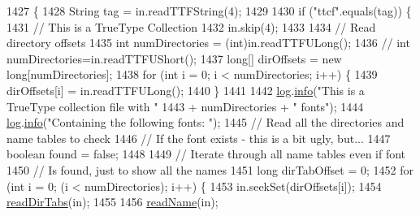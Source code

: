 \begin{DoxyCode}
1427                                                                                         \{
1428         String tag = in.readTTFString(4);
1429 
1430         \textcolor{keywordflow}{if} (\textcolor{stringliteral}{"ttcf"}.equals(tag)) \{
1431             \textcolor{comment}{// This is a TrueType Collection}
1432             in.skip(4);
1433 
1434             \textcolor{comment}{// Read directory offsets}
1435             \textcolor{keywordtype}{int} numDirectories = (int)in.readTTFULong();
1436             \textcolor{comment}{// int numDirectories=in.readTTFUShort();}
1437             \textcolor{keywordtype}{long}[] dirOffsets = \textcolor{keyword}{new} \textcolor{keywordtype}{long}[numDirectories];
1438             \textcolor{keywordflow}{for} (\textcolor{keywordtype}{int} i = 0; i < numDirectories; i++) \{
1439                 dirOffsets[i] = in.readTTFULong();
1440             \}
1441 
1442             \mbox{\hyperlink{classorg_1_1newdawn_1_1slick_1_1tools_1_1hiero_1_1truetype_1_1_t_t_f_file_ae6acbd4aea68fd8cf15305aa535993f4}{log}}.\mbox{\hyperlink{classorg_1_1newdawn_1_1slick_1_1tools_1_1hiero_1_1truetype_1_1_log_a7c258286d01348186fadbb45f0da36b9}{info}}(\textcolor{stringliteral}{"This is a TrueType collection file with "}
1443                                    + numDirectories + \textcolor{stringliteral}{" fonts"});
1444             \mbox{\hyperlink{classorg_1_1newdawn_1_1slick_1_1tools_1_1hiero_1_1truetype_1_1_t_t_f_file_ae6acbd4aea68fd8cf15305aa535993f4}{log}}.\mbox{\hyperlink{classorg_1_1newdawn_1_1slick_1_1tools_1_1hiero_1_1truetype_1_1_log_a7c258286d01348186fadbb45f0da36b9}{info}}(\textcolor{stringliteral}{"Containing the following fonts: "});
1445             \textcolor{comment}{// Read all the directories and name tables to check}
1446             \textcolor{comment}{// If the font exists - this is a bit ugly, but...}
1447             \textcolor{keywordtype}{boolean} found = \textcolor{keyword}{false};
1448 
1449             \textcolor{comment}{// Iterate through all name tables even if font}
1450             \textcolor{comment}{// Is found, just to show all the names}
1451             \textcolor{keywordtype}{long} dirTabOffset = 0;
1452             \textcolor{keywordflow}{for} (\textcolor{keywordtype}{int} i = 0; (i < numDirectories); i++) \{
1453                 in.seekSet(dirOffsets[i]);
1454                 \mbox{\hyperlink{classorg_1_1newdawn_1_1slick_1_1tools_1_1hiero_1_1truetype_1_1_t_t_f_file_af88f53fa1db71b0b5c7164a23c83e485}{readDirTabs}}(in);
1455 
1456                 \mbox{\hyperlink{classorg_1_1newdawn_1_1slick_1_1tools_1_1hiero_1_1truetype_1_1_t_t_f_file_a64b676636833c77afa694867a0377713}{readName}}(in);

\end{DoxyCode}
